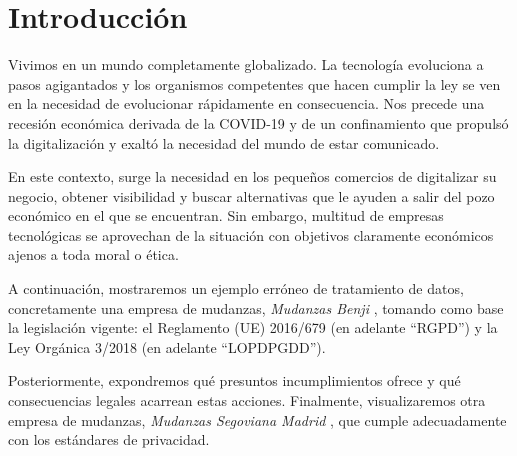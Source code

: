 \section{Introducción}
Vivimos en un mundo completamente globalizado. La tecnología evoluciona a pasos agigantados y los organismos competentes que hacen cumplir la ley se ven en la necesidad de evolucionar rápidamente en consecuencia. Nos precede una recesión económica derivada de la COVID-19 y de un confinamiento que propulsó la digitalización y exaltó la necesidad del mundo de estar comunicado.

En este contexto, surge la necesidad en los pequeños comercios de digitalizar su negocio, obtener visibilidad y buscar alternativas que le ayuden a salir del pozo económico en el que se encuentran. Sin embargo, multitud de empresas tecnológicas se aprovechan de la situación con objetivos claramente económicos ajenos a toda moral o ética.

A continuación, mostraremos un ejemplo erróneo de tratamiento de datos, concretamente una empresa de mudanzas, \textit{Mudanzas Benji} \cite{benji}, tomando como base la legislación vigente: el Reglamento (UE) 2016/679 \cite{RGPD} (en adelante ``RGPD'') y la Ley Orgánica 3/2018 \cite{LOPDPGDD} (en adelante ``LOPDPGDD'').

Posteriormente, expondremos qué presuntos incumplimientos ofrece y qué consecuencias legales acarrean estas acciones. Finalmente, visualizaremos otra empresa de mudanzas, \textit{Mudanzas Segoviana Madrid} \cite{alcorcon}, que cumple adecuadamente con los estándares de privacidad.
